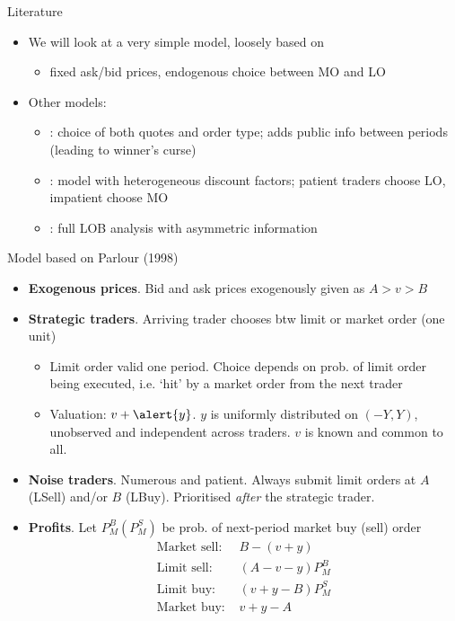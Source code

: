 \documentclass[english,10pt
,aspectratio=169
]{beamer}
\begin{document}
\begin{frame}{Literature}
	\begin{itemize}
		\item We will look at a very simple model, loosely based on \cite{parlour_price_1998}
		\begin{itemize}
			\item fixed ask/bid prices, endogenous choice between MO and LO
		\end{itemize}
		\item Other models:
		\begin{itemize}
			\item \cite{foucault_order_1999}: choice of both quotes and order type; adds public info between periods (leading to winner's curse)
			\item \citet*{foucault_limit_2005}: model with heterogeneous discount factors; patient traders choose LO, impatient choose MO
			\item \cite{bhattacharya_limit_2020}: full LOB analysis with asymmetric information
		\end{itemize}
	\end{itemize}
\end{frame}


\begin{frame}{Model based on Parlour (1998)}
	\begin{itemize}
		\item \textbf{Exogenous prices}. Bid and ask prices \alert{exogenously} given as $A>v>B$
		\item \textbf{Strategic traders}. Arriving trader chooses btw limit or market order (one unit)
		\begin{itemize}
			\item Limit order valid one period. Choice depends on prob. of limit order being executed, i.e. `hit' by a market order from the next trader
			\item Valuation: $v+\alert{y}$. $y$ is uniformly distributed on $(-Y,Y)$, unobserved and independent across traders. $v$ is known and common to all.
		\end{itemize}
		\item \textbf{Noise traders}. Numerous and patient. Always submit limit orders at $A$ (LSell) and/or $B$ (LBuy). Prioritised \emph{after} the strategic trader.
		\item \textbf{Profits}. Let $P^B_M (P^S_M)$ be prob. of next-period market buy (sell) order 
		\begin{align*}
		\text{Market sell: } & B-(v+y) \\
		\text{Limit sell: } & (A-v-y)P^B_M \\
		\text{Limit buy: } &(v+y-B)P^S_M \\
		\text{Market buy: } &v+y-A
		\end{align*}
	\end{itemize}
\end{frame}
\end{document}
